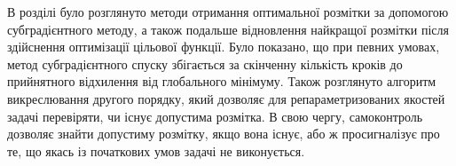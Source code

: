 \chapterConclusion

В розділі було розглянуто методи отримання оптимальної розмітки за допомогою
субградієнтного методу, а також подальше відновлення найкращої розмітки після 
здійснення оптимізації цільової функції. Було показано, що при певних умовах, 
метод субградієнтного спуску збігається за скінченну кількість кроків до прийнятного 
відхилення від глобального мінімуму. Також розглянуто алгоритм викреслювання другого порядку, 
який дозволяє для репараметризованих якостей задачі перевіряти, чи існує допустима розмітка.
В свою чергу, самоконтроль дозволяє знайти допустиму розмітку, якщо вона існує, або ж
просигналізує про те, що якась із початкових умов задачі не виконується.